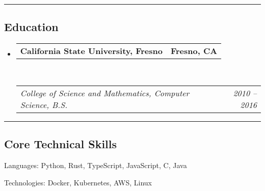 \documentclass[10pt,letterpaper]{article}
\makeatletter
\newenvironment{indentsection}[1]%
{\begin{list}{}%
	{\setlength{\leftmargin}{#1}}%
	\item[]%
}
{\end{list}}
\newcommand{\headerrow}[2]
{\begin{tabular*}{\linewidth}{l@{\extracolsep{\fill}}r}
	#1 &
	#2 \\
\end{tabular*}}
\newcommand{\CPP}
{C\nolinebreak[4]\hspace{-.05em}\raisebox{.22ex}{\footnotesize\bf ++}}
\makeatother
\begin{document}
\hrule
\vspace{-0.4em}
\subsection*{Education}

\begin{itemize}
	\parskip=0.1em

	\item
	      \headerrow
	      {\textbf{California State University, Fresno}}
	      {\textbf{Fresno, CA}}
	      \\
	      \headerrow
	      {\emph{College of Science and Mathematics, Computer Science, B.S.}}
	      {\emph{2010 -- 2016}}

\end{itemize}


\hrule
\vspace{-0.4em}
\subsection*{Core Technical Skills}

\begin{indentsection}{\parindent}
	\begin{description*}
		\item[Languages:]
			Python, Rust, TypeScript, JavaScript, \CPP, Java
		\item[Technologies:]
			Docker, Kubernetes, AWS, Linux
	\end{description*}
\end{indentsection}
\end{document}
